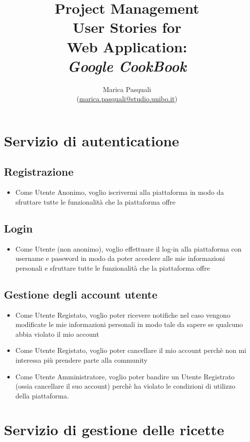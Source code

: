 \documentclass{article}
\title{
    Project Management \\
    \textbf{ 
        User Stories for\\ 
        Web Application: \\
        \textit{Google CookBook}
    }
}
\author{
    Marica Pasquali \\ 
    (\href{mailto:marica.pasquali@studio.unibo.it}{marica.pasquali@studio.unibo.it})
}
\begin{document}
\maketitle
\newpage
\tableofcontents
\newpage

\section{Servizio di autenticatione}
\subsection{Registrazione}
\begin{itemize}
    \item Come Utente Anonimo, voglio iscrivermi alla piattaforma in modo da sfruttare tutte le funzionalità 
    che la piattaforma offre
\end{itemize}

\subsection{Login}
\begin{itemize}
    \item Come Utente (non anonimo), voglio effettuare il log-in alla piattaforma con username e password 
    in modo da poter accedere alle mie informazioni personali e sfruttare tutte le funzionalità che 
    la piattaforma offre
\end{itemize}

\subsection{Gestione degli account utente}
\begin{itemize}
    \item Come Utente Registato, voglio poter ricevere notifiche nel caso vengono modificate le mie 
    informazioni personali in modo tale da sapere se qualcuno abbia violato il mio account
    \item Come Utente Registato, voglio poter cancellare il mio account perchè non mi interessa più 
    prendere parte alla community
    \item Come Utente Amministratore, voglio poter bandire un Utente Registrato (ossia cancellare il suo account)
    perchè ha violato le condizioni di utilizzo della piattaforma.
\end{itemize}


\section{Servizio di gestione delle ricette}
\end{document}
